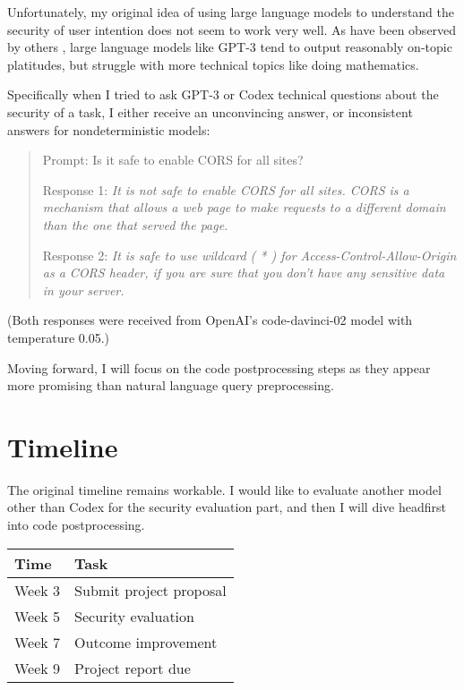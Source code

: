 \documentclass[10pt,sigplan,screen,nonacm]{acmart}
\begin{document}
Unfortunately, my original idea of using large language models to understand the security of user intention does not seem to work very well. As have been observed by others \cite{llm-math}, large language models like GPT-3 tend to output reasonably on-topic platitudes, but struggle with more technical topics like doing mathematics.

Specifically when I tried to ask GPT-3 or Codex technical questions about the security of a task, I either receive an unconvincing answer, or inconsistent answers for nondeterministic models:
\begin{quote}
    Prompt: Is it safe to enable CORS for all sites?

    Response 1: \em It is not safe to enable CORS for all sites.
    CORS is a mechanism that allows a web page to make requests to a different domain than the one that served the page.
    \em

    Response 2: \em It is safe to use wildcard ( * ) for Access-Control-Allow-Origin as a CORS header, if you are sure that you don’t have any sensitive data in your server.

\end{quote}
(Both responses were received from OpenAI's \textsf{code-davinci-02} model with temperature 0.05.)

Moving forward, I will focus on the code postprocessing steps as they appear more promising than natural language query preprocessing.

\section{Timeline}

The original timeline remains workable. I would like to evaluate another model other than Codex for the security evaluation part, and then I will dive headfirst into code postprocessing.
\begin{center}
    \begin{tabular}{@{}ll@{}} \toprule
        Time & Task \\ \midrule
        Week 3 & Submit project proposal \\
        Week 5 & Security evaluation \\
        Week 7 & Outcome improvement \\
        Week 9 & Project report due \\
        \bottomrule
    \end{tabular}
\end{center}



\end{document}

